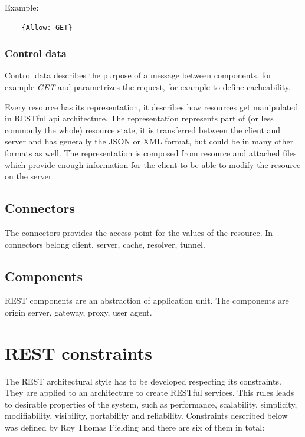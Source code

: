   Example: 
  \begin{center}
  \begin{lstlisting}
    {Allow: GET}
  \end{lstlisting}
  \end{center}
  
\subsubsection{Control data}
  Control data describes the purpose of a message between components, for example \emph{GET} and parametrizes the request, for example to define cacheability. 
  
\bigskip

  Every resource has its representation, it describes how resources get manipulated in RESTful \gls{api} architecture. The representation represents part of (or less commonly the whole) resource state, it is transferred between the client and server and has generally the JSON or XML format, but could be in many other formats as well. The representation is composed from resource and attached files which provide enough information for the client to be able to modify the resource on the server.

\subsection{Connectors}
The connectors provides the access point for the values of the resource. In connectors belong client, server, cache, resolver, tunnel. %

\subsection{Components}
REST components are an abstraction of application unit. The components are origin server, gateway, proxy, user agent. %

\section{REST constraints}
\label{sec:constraints}

The REST architectural style has to be developed respecting its constraints. They are applied to an architecture to create RESTful services. This rules leads to desirable properties of the system, such as performance, scalability, simplicity, modifiability, visibility, portability and reliability. Constraints described below was defined by Roy Thomas Fielding and there are six of them in total:
 
